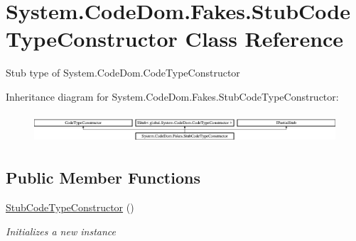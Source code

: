 \hypertarget{class_system_1_1_code_dom_1_1_fakes_1_1_stub_code_type_constructor}{\section{System.\-Code\-Dom.\-Fakes.\-Stub\-Code\-Type\-Constructor Class Reference}
\label{class_system_1_1_code_dom_1_1_fakes_1_1_stub_code_type_constructor}
}


Stub type of System.\-Code\-Dom.\-Code\-Type\-Constructor 


Inheritance diagram for System.\-Code\-Dom.\-Fakes.\-Stub\-Code\-Type\-Constructor\-:\begin{figure}[H]
\begin{center}
\leavevmode
\includegraphics[height=1.107814cm]{class_system_1_1_code_dom_1_1_fakes_1_1_stub_code_type_constructor}
\end{center}
\end{figure}
\subsection*{Public Member Functions}
\begin{DoxyCompactItemize}
\item 
\hyperlink{class_system_1_1_code_dom_1_1_fakes_1_1_stub_code_type_constructor_a3571004c57a9d5ac4131096250665357}{Stub\-Code\-Type\-Constructor} ()
\begin{DoxyCompactList}\small\item\em Initializes a new instance\end{DoxyCompactList}\end{DoxyCompactItemize}
